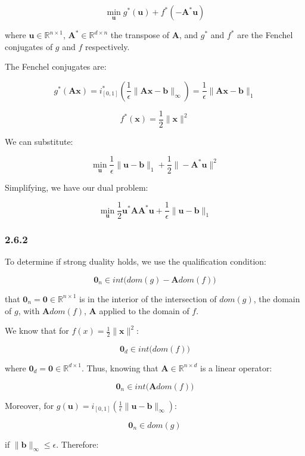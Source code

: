 \documentclass[12pt]{article}
\begin{document}
\[\min_{\textbf{u}}  g^*(\textbf{u}) + f^*(-\textbf{A}^*\textbf{u})\]

where $\textbf{u} \in \mathbb{R}^{n \times 1}$, $\textbf{A}^* \in \mathbb{R}^{d\times n}$ the transpose of $\textbf{A}$, and $g^*$ and $f^*$ are the Fenchel conjugates of $g$ and $f$ respectively.

The Fenchel conjugates are:

\[g^*(\textbf{Ax}) = i^*_{[0, 1]}\left(\frac{1}{\epsilon}\|\textbf{A}\textbf{x} - \textbf{b}\|_{\infty}\right) = \frac{1}{\epsilon} \| \textbf{A}\textbf{x} - \textbf{b}\|_1\]

\[f^*(\textbf{x}) =  \frac{1}{2}\|\textbf{x}\|^2\]

We can substitute:

\[\min_{\textbf{u}}  \frac{1}{\epsilon} \| \textbf{u} - \textbf{b}\|_1 +  \frac{1}{2}\|-\textbf{A}^*\textbf{u}\|^2\]

Simplifying, we have our dual problem:

\[\min_{\textbf{u}} \frac{1}{2}\textbf{u}^*\textbf{A}\textbf{A}^*\textbf{u} + \frac{1}{\epsilon} \| \textbf{u} - \textbf{b}\|_1\]

\subsubsection*{2.6.2}

To determine if strong duality holds, we use the qualification condition:

\[\textbf{0}_n \in int \big(dom(g) - \textbf{A}dom(f)\big)\]

that $\textbf{0}_n = \textbf{0} \in \mathbb{R}^{n \times 1}$ is in the interior of the intersection of  $dom(g)$, the domain of $g$, with $\textbf{A}dom(f)$, $\textbf{A}$ applied to the domain of $f$.

We know that for $f(x) = \frac{1}{2}\|\textbf{x}\|^2$:

\[\textbf{0}_d \in int \big(dom(f)\big)\]

where $\textbf{0}_d = \textbf{0} \in \mathbb{R}^{d \times 1}$. Thus, knowing that $\textbf{A} \in \mathbb{R}^{n\times d}$ is a linear operator:

\[\textbf{0}_n \in int \big(\textbf{A} dom(f)\big)\]

Moreover, for $g(\textbf{u}) =  i_{[0, 1]}\left(\frac{1}{\epsilon}\|\textbf{u} - \textbf{b}\|_{\infty}\right)$:

\[\textbf{0}_n \in dom(g)\]

if $\|\textbf{b}\|_{\infty} \leq \epsilon$. Therefore:
\end{document}
